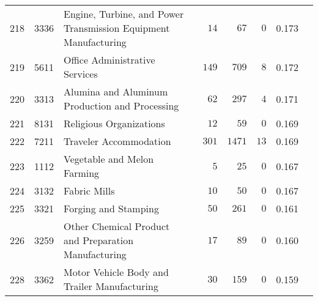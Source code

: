 \documentclass[9pt, oneside]{article}   	%
\begin{document}
\begin{longtable}{lcp{3 in}ccccc}
218  & 3336 & Engine, Turbine, and Power Transmission Equipment Manufacturing & $\phantom{00}14$ & $\phantom{00}67$ & $\phantom{0}0$ & 0.173 \\
219  & 5611 & Office Administrative Services & $\phantom{0}149$ & $\phantom{0}709$ & $\phantom{0}8$ & 0.172 \\
220  & 3313 & Alumina and Aluminum Production and Processing & $\phantom{00}62$ & $\phantom{0}297$ & $\phantom{0}4$ & 0.171 \\
221  & 8131 & Religious Organizations & $\phantom{00}12$ & $\phantom{00}59$ & $\phantom{0}0$ & 0.169 \\
222  & 7211 & Traveler Accommodation & $\phantom{0}301$ & $1471$ & $13$ & 0.169 \\
223  & 1112 & Vegetable and Melon Farming & $\phantom{000}5$ & $\phantom{00}25$ & $\phantom{0}0$ & 0.167 \\
224  & 3132 & Fabric Mills & $\phantom{00}10$ & $\phantom{00}50$ & $\phantom{0}0$ & 0.167 \\
225  & 3321 & Forging and Stamping & $\phantom{00}50$ & $\phantom{0}261$ & $\phantom{0}0$ & 0.161 \\
226  & 3259 & Other Chemical Product and Preparation Manufacturing & $\phantom{00}17$ & $\phantom{00}89$ & $\phantom{0}0$ & 0.160 \\

228  & 3362 & Motor Vehicle Body and Trailer Manufacturing & $\phantom{00}30$ & $\phantom{0}159$ & $\phantom{0}0$ & 0.159 \\


\end{longtable}
\end{document}
